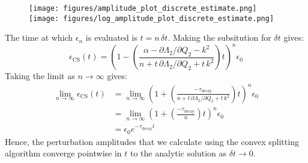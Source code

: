 \documentclass[reqno]{article}
\begin{document}
\begin{figure}[H]
    \centering
    \texttt{[image: figures/amplitude\_plot\_discrete\_estimate.png]}
    \texttt{[image: figures/log\_amplitude\_plot\_discrete\_estimate.png]}
\end{figure}
The time at which $\epsilon_n$ is evaluated is $t = n \, \delta t$.
Making the subsitution for $\delta t$ gives:
\begin{equation}
    \epsilon_\text{CS} (t)
    =
    \left(1 
    - \left( \frac{\alpha - \partial \Lambda_2 / \partial Q_2 - k^2}
    {n + t \, \partial \Lambda_2 / \partial Q_2 + t \, k^2}
    \right) t \right)^n \epsilon_0
\end{equation}
Taking the limit as $n \to \infty$ gives:
\begin{equation}
    \begin{split}
        \lim_{n \to \infty} \epsilon_\text{CS} (t)
        &=
        \lim_{n \to \infty}
        \left(1 
        + \left( \frac{-\tau_\text{decay}}
        {n + t \, \partial \Lambda_2 / \partial Q_2 + t \, k^2}
        \right) t \right)^n \epsilon_0 \\
        &=
        \lim_{n \to \infty}
        \left(1 
        + \left( \frac{-\tau_\text{decay}}{n}
        \right) t \right)^n \epsilon_0 \\
        &=
        \epsilon_0 e^{-\tau_\text{decay} t}
    \end{split}
\end{equation}
Hence, the perturbation amplitudes that we calculate using the convex splitting algorithm converge pointwise in $t$ to the analytic solution as $\delta t \to 0$.
\end{document}
